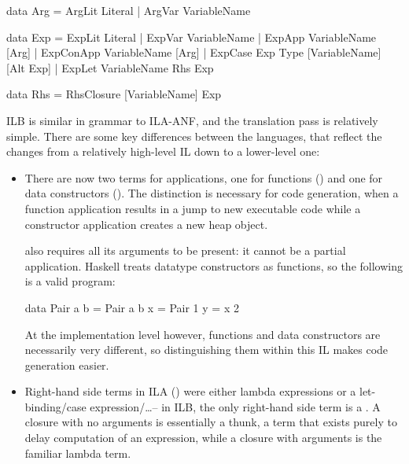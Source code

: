 \documentclass[dissertation.tex]{subfiles}
\begin{document}
{{        \begin{haskellfigure}
        data Arg = ArgLit Literal
                 | ArgVar VariableName

        data Exp = ExpLit Literal
                 | ExpVar VariableName
                 | ExpApp VariableName [Arg]
                 | ExpConApp VariableName [Arg]
                 | ExpCase Exp Type [VariableName] [Alt Exp]
                 | ExpLet VariableName Rhs Exp

        data Rhs = RhsClosure [VariableName] Exp
        \end{haskellfigure}

        ILB is similar in grammar to ILA-ANF, and the translation pass is relatively simple. There are some key
        differences between the languages, that reflect the changes from a relatively high-level IL down to a
        lower-level one:

        \begin{itemize}
        \item
        {

            There are now two terms for applications, one for functions () and one for data
            constructors (). The distinction is necessary for code generation, when a function
            application results in a jump to new executable code while a constructor application creates a new heap
            object.

             also requires all its arguments to be present: it cannot be a partial application.
            Haskell treats datatype constructors as functions, so the following is a valid program:

            \begin{haskellfigure}
            data Pair a b = Pair a b
            x = Pair 1
            y = x 2
            \end{haskellfigure}

            At the implementation level however, functions and data constructors are necessarily very different, so
            distinguishing them within this IL makes code generation easier.


        }
        \item
        {

            Right-hand side terms in ILA () were either lambda expressions or a let-binding/case
            expression/\dots -- in ILB, the only right-hand side term is a . A closure with no
            arguments is essentially a thunk, a term that exists purely to delay computation of an expression, while
            a closure with arguments is the familiar lambda term.

}
\end{itemize}}}
\end{document}
